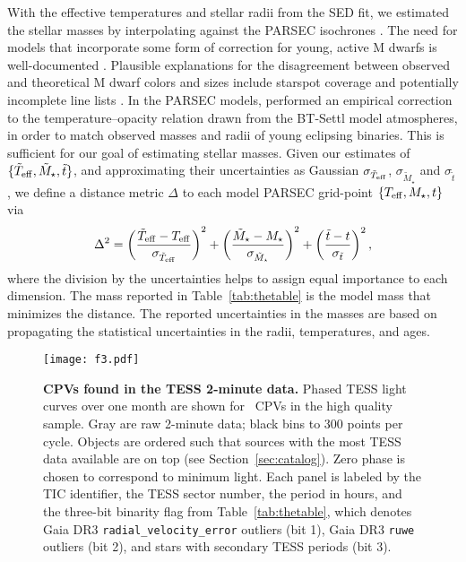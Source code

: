 \documentclass[11pt,twocolumn,tighten]{aastex63}
\begin{document}
With the effective temperatures and stellar radii from the SED fit, we
estimated the stellar masses by interpolating against the PARSEC
isochrones \citep[v1.2S][]{2014MNRAS.444.2525C}.  The need for models
that incorporate some form of correction for young, active M dwarfs is
well-documented
\citep[e.g.][]{2012ApJ...756...47S,2015ApJ...804..146D,2016A&A...593A..99F,2020ApJ...891...29S}.
Plausible explanations for the disagreement between observed and
theoretical M dwarf colors and sizes include starspot coverage
\citep[e.g.][]{2017ApJ...836..200G} and potentially incomplete line
lists \citep[e.g.][]{2013A&A...556A..15R}.  In the PARSEC models,
\citet{2014MNRAS.444.2525C} performed an empirical correction to the
temperature--opacity relation drawn from the BT-Settl model
atmospheres, in order to match observed masses and radii of young
eclipsing binaries.  This is sufficient for our goal of estimating
stellar masses.  Given our estimates of $\{ \tilde{T}_{\rm eff},
\tilde{M}_\star, \tilde{t} \}$, and approximating their uncertainties
as Gaussian $\sigma_{\tilde{T}_{\rm eff}}$, $\sigma_{\tilde{M}_\star}$
and $\sigma_{\tilde{t}}$, we define a distance metric $\Delta$ to each
model PARSEC grid-point $\{ T_{\rm eff}, M_\star, t \}$ via
\begin{equation}
  \Delta^2 = 
  \left( \frac{\tilde{T}_{\rm eff} - T_{\rm eff}}{\sigma_{\tilde{T}_{\rm eff}}} \right)^2
  +
  \left( \frac{\tilde{M}_{\star} - M_{\star}}{\sigma_{\tilde{M}_{\star}}} \right)^2
  +
  \left( \frac{\tilde{t} - t}{\sigma_{\tilde{t}}} \right)^2,
\end{equation}
where the division by the uncertainties helps to assign equal
importance to each dimension.  The mass reported in
Table~\ref{tab:thetable} is the model mass that minimizes the
distance.  The reported uncertainties in the masses are based on
propagating the statistical uncertainties in the radii, temperatures,
and ages.


\begin{figure*}[!tp]
	\begin{center}
		\centering
		\texttt{[image: f3.pdf]}
    \vspace{-0.3cm}
		\caption{
      {\bf CPVs found in the TESS 2-minute data.}
      Phased TESS light curves over one month are shown for \ngoods\
      CPVs in the high quality sample.  Gray are raw 2-minute data;
      black bins to 300 points per cycle.  Objects are ordered such
      that sources with the most TESS data available are on top (see
      Section~\ref{sec:catalog}).  Zero phase is chosen to correspond
      to minimum light.  Each panel is labeled by the TIC identifier,
      the TESS sector number, the period in hours, and the three-bit
      binarity flag from Table~\ref{tab:thetable}, which denotes Gaia
      DR3 \texttt{radial\_velocity\_error} outliers (bit 1), Gaia DR3
      \texttt{ruwe} outliers (bit 2), and stars with secondary TESS
      periods (bit 3). 
		}
		\label{fig:cqvs}
	\end{center}
\end{figure*}
\end{document}
